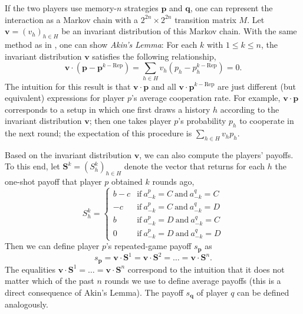 \documentclass{article}
\theoremstyle{definition}
\begin{document}
If the two players use memory-$n$ strategies $\mathbf{p}$ and $\mathbf{q}$, one can represent the interaction as a Markov chain with a $2^{2n}\!\times\!2^{2n}$ transition matrix $M$. 
Let $\mathbf{v}=(v_h)_{h\in H}$ be an invariant distribution of this Markov chain. 
With the same method as in \citep{akin:EGADS:2016}, one can show {\it Akin's Lemma}: For each $k$ with $1\!\le\!k\!\le\!n$, the invariant distribution $\mathbf{v}$ satisfies the following relationship,
\begin{equation} \label{Eq:AkinsLemma}
\mathbf{v} \cdot (\mathbf{p}-\mathbf{p}^{k-\text{Rep}}) \!=\! \sum_{h\in H} v_h (p_h-p_h^{k-\text{Rep}}) = 0.
\end{equation}
The intuition for this result is that $\mathbf{v}\cdot \mathbf{p}$ and all $\mathbf{v}\cdot \mathbf{p}^{k-\text{Rep}}$ are just different (but equivalent) expressions for player $p$'s average cooperation rate. For example, $\mathbf{v}\cdot\mathbf{p}$ corresponds to a setup in which one first draws a history $h$ according to the invariant distribution $\mathbf{v}$; then one takes player $p$'s probability $p_h$ to cooperate in the next round; the expectation of this procedure is $\sum_{h\in H} v_h p_h$.

Based on the invariant distribution $\mathbf{v}$, we can also compute the players' payoffs. To this end, let $\mathbf{S}^k = (S_h^k)_{h\in H}$ denote the vector that returns for each $h$ the one-shot payoff that player $p$ obtained $k$ rounds ago, 
\begin{equation}
S_h^k = \left\{
\begin{array}{cl}
b-c	&\text{if}~ a_{-k}^p=C~\text{and}~ a_{-k}^q=C\\
-c	&\text{if}~ a_{-k}^p=C~\text{and}~ a_{-k}^q=D\\
b	&\text{if}~ a_{-k}^p=D~\text{and}~ a_{-k}^q=C\\
0	&\text{if}~ a_{-k}^p=D~\text{and}~ a_{-k}^q=D
\end{array}
\right.
\end{equation}
Then we can define player $p$'s repeated-game payoff $s_\mathbf{p}$ as 
\begin{equation} \label{Eq:Payoff}
s_\mathbf{p} = \mathbf{v}\cdot \mathbf{S}^1 = \mathbf{v}\cdot \mathbf{S}^2 = \ldots = \mathbf{v} \cdot \mathbf{S}^n.
\end{equation}
The equalities $ \mathbf{v}\cdot \mathbf{S}^1 = \ldots = \mathbf{v} \cdot \mathbf{S}^n$ correspond to the intuition that it does not matter which of the past $n$ rounds we use to define average payoffs (this is a direct consequence of Akin's Lemma). 
The payoff $s_\mathbf{q}$ of player $q$ can be defined analogously. 
\end{document}
